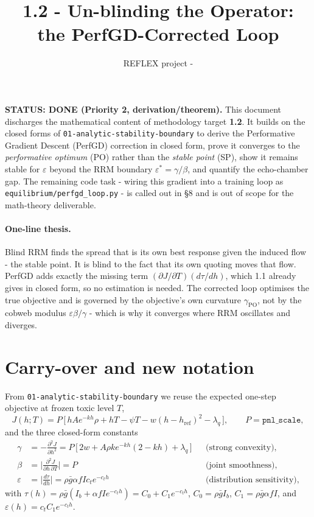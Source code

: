 \documentclass[11pt]{article}
\title{\textbf{1.2 - Un-blinding the Operator:\\ the PerfGD-Corrected Loop}}
\author{REFLEX project - \code{math-theory}}
\date{}
\newcommand{\eps}{\varepsilon}
\newcommand{\gbar}{\bar g}
\newcommand{\href}{h_{\mathrm{ref}}}
\newcommand{\code}[1]{\texttt{#1}}
\newcommand{\gPO}{\gamma_{\mathrm{PO}}}
\begin{document}
\maketitle

\noindent\textbf{STATUS: DONE (Priority 2, derivation/theorem).} This document
discharges the mathematical content of methodology target \textbf{1.2}. It builds
on the closed forms of \code{01-analytic-stability-boundary} to derive the
Performative Gradient Descent (PerfGD) correction in closed form, prove it
converges to the \emph{performative optimum} (PO) rather than the \emph{stable
point} (SP), show it remains stable for $\eps$ beyond the RRM boundary
$\eps^*=\gamma/\beta$, and quantify the echo-chamber gap. The remaining code task
- wiring this gradient into a training loop as \code{equilibrium/perfgd\_loop.py}
- is called out in \S8 and is out of scope for the math-theory deliverable.

\paragraph{One-line thesis.}
Blind RRM finds the spread that is its own best response given the induced flow
- the stable point. It is blind to the fact that its own quoting moves that
flow. PerfGD adds exactly the missing term $(\partial J/\partial T)(d\tau/dh)$,
which 1.1 already gives in closed form, so no estimation is needed. The corrected
loop optimises the true objective and is governed by the objective's own
curvature $\gPO$, not by the cobweb modulus $\eps\beta/\gamma$ - which is why it
converges where RRM oscillates and diverges.

\section{Carry-over and new notation}

From \code{01-analytic-stability-boundary} we reuse the expected one-step
objective at frozen toxic level $T$,
%
\begin{equation*}
  J(h;T) = P\,\big[\, h A e^{-kh}\rho + hT - \psi T - w(h-\href)^2 - \lambda_q \,\big],
  \qquad P=\code{pnl\_scale},
\end{equation*}
%
and the three closed-form constants
%
\begin{align*}
  \gamma   &= -\frac{\partial^2 J}{\partial h^2}
            = P\,\big[\,2w + A\rho k e^{-kh}(2-kh) + \lambda_q\,\big]
            && \text{(strong convexity)},\\
  \beta    &= \Big|\frac{\partial^2 J}{\partial h\,\partial T}\Big| = P
            && \text{(joint smoothness)},\\
  \eps     &= \Big|\frac{d\tau}{dh}\Big| = \rho\gbar\alpha f I c_t e^{-c_t h}
            && \text{(distribution sensitivity)},
\end{align*}
%
with $\tau(h)=\rho\gbar(I_b+\alpha f I e^{-c_t h})=C_0+C_1 e^{-c_t h}$,
$C_0=\rho\gbar I_b$, $C_1=\rho\gbar\alpha f I$, and $\eps(h)=c_t C_1 e^{-c_t h}$.
\end{document}
